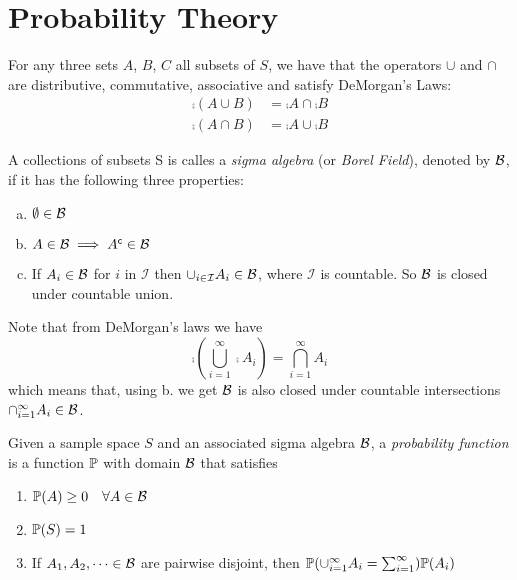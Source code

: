 \section{Probability Theory}

\begin{theorem}
    For any three sets $A$, $B$, $C$ all subsets of $S$, we have that the operators $\cup$ and $\cap$ are distributive, commutative, associative and satisfy DeMorgan's Laws:
    \begin{align*}
        \comp{(A \cup B)} &= \comp{A} \cap \comp{B} \\
        \comp{(A \cap B)} &= \comp{A} \cup \comp{B}
    \end{align*}
\end{theorem}

\begin{definition}
    A collections of subsets S is calles a \emph{sigma algebra} (or \emph{Borel Field}), denoted by $\B{}$, if it has the following three properties:
    \begin{enumerate}[a.]
        \item $\emptyset \in \B{}$
        \item $A \in \B{} \implies \comp{A} \in \B{}$
        \item If $A_i \in \B{}$ for $i$ in $\mathcal{I}$ then $\cup_{i\in\mathcal{I}}A_i \in \B{}$, where $\mathcal{I}$ is countable. So $\B{}$ is closed under countable union.
    \end{enumerate}
\end{definition}

Note that from DeMorgan's laws we have
\begin{equation}
    \comp{\left(\bigcup_{i=1}^\infty \comp{A_i}\right)} = \bigcap_{i=1}^\infty A_i
\end{equation}
which means that, using b. we get $\B{}$ is also closed under countable intersections $\cap_{i=1}^\infty A_i \in \B{}$.

\begin{definition}
    Given a sample space $S$ and an associated sigma algebra $\B{}$, a \emph{probability function} is a function $\P{}$ with domain $\B{}$ that satisfies
    \begin{enumerate}
        \item $\P{}(A) \geq 0 \quad \forall A \in \B{}$
        \item $\P{}(S) = 1$
        \item If $A_1, A_2, \dots \in \B{}$ are pairwise disjoint, then $\P{}(\cup_{i=1}^\infty A_i = \sum_{i=1}^{\infty})\P{}(A_i)$
    \end{enumerate}
\end{definition}

